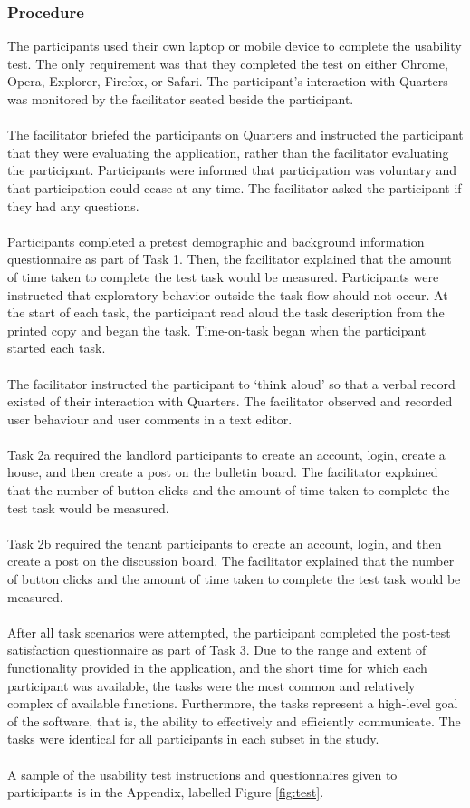 \documentclass[12pt]{article}
\begin{document}
\subsubsection{Procedure}
The participants used their own laptop or mobile device to complete the usability test. The only requirement was that they completed the test on either Chrome, Opera, Explorer, Firefox, or Safari. The participant’s interaction with Quarters was monitored by the facilitator seated beside the participant. \\ \\
The facilitator briefed the participants on Quarters and instructed the participant that they were evaluating the application, rather than the facilitator evaluating the participant. Participants were informed that participation was voluntary and that participation could cease at any time. The facilitator asked the participant if they had any questions. \\ \\
Participants completed a pretest demographic and background information questionnaire as part of Task 1. Then, the facilitator explained that the amount of time taken to complete the test task would be measured. Participants were instructed that exploratory behavior outside the task flow should not occur. At the start of each task, the participant read aloud the task description from the printed copy and began the task. Time-on-task began when the participant started each task. \\ \\
The facilitator instructed the participant to ‘think aloud’ so that a verbal record existed of their interaction with Quarters. The facilitator observed and recorded user behaviour and user comments in a text editor. \\ \\
Task 2a required the landlord participants to create an account, login, create a house, and then create a post on the bulletin board. The facilitator explained that the number of button clicks and the amount of time taken to complete the test task would be measured. \\ \\
Task 2b required the tenant participants to create an account, login, and then create a post on the discussion board. The facilitator explained that the number of button clicks and the amount of time taken to complete the test task would be measured. \\ \\
After all task scenarios were attempted, the participant completed the post-test satisfaction questionnaire as part of Task 3. 
Due to the range and extent of functionality provided in the application, and the short time for which each participant was available, the tasks were the most common and relatively complex of available functions. Furthermore, the tasks represent a high-level goal of the software, that is, the ability to effectively and efficiently communicate. The tasks were identical for all participants in each subset in the study. \\ \\
A sample of the usability test instructions and questionnaires given to participants is in the Appendix, labelled Figure \ref{fig:test}. 
\end{document}
